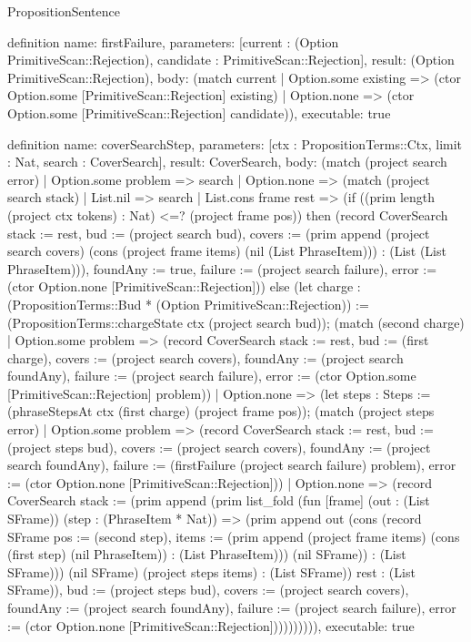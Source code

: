 \begin{lexlean}{PropositionSentence}
\begin{semanticmodule}
definition{
  name: firstFailure,
  parameters: [current : (Option PrimitiveScan::Rejection), candidate : PrimitiveScan::Rejection],
  result: (Option PrimitiveScan::Rejection),
  body: (match current
    | Option.some existing => (ctor Option.some [PrimitiveScan::Rejection] existing)
    | Option.none => (ctor Option.some [PrimitiveScan::Rejection] candidate)),
  executable: true
}

definition{
  name: coverSearchStep,
  parameters: [ctx : PropositionTerms::Ctx, limit : Nat, search : CoverSearch],
  result: CoverSearch,
  body: (match (project search error)
    | Option.some problem => search
    | Option.none => (match (project search stack)
      | List.nil => search
      | List.cons frame rest => (if ((prim length (project ctx tokens) : Nat) <=? (project frame pos)) then (record CoverSearch {stack := rest, bud := (project search bud), covers := (prim append (project search covers) (cons (project frame items) (nil (List PhraseItem))) : (List (List PhraseItem))), foundAny := true, failure := (project search failure), error := (ctor Option.none [PrimitiveScan::Rejection])}) else (let charge : (PropositionTerms::Bud * (Option PrimitiveScan::Rejection)) := (PropositionTerms::chargeState ctx (project search bud)); (match (second charge)
        | Option.some problem => (record CoverSearch {stack := rest, bud := (first charge), covers := (project search covers), foundAny := (project search foundAny), failure := (project search failure), error := (ctor Option.some [PrimitiveScan::Rejection] problem)})
        | Option.none => (let steps : Steps := (phraseStepsAt ctx (first charge) (project frame pos)); (match (project steps error)
          | Option.some problem => (record CoverSearch {stack := rest, bud := (project steps bud), covers := (project search covers), foundAny := (project search foundAny), failure := (firstFailure (project search failure) problem), error := (ctor Option.none [PrimitiveScan::Rejection])})
          | Option.none => (record CoverSearch {stack := (prim append (prim list_fold (fun [frame] (out : (List SFrame)) (step : (PhraseItem * Nat)) => (prim append out (cons (record SFrame {pos := (second step), items := (prim append (project frame items) (cons (first step) (nil PhraseItem)) : (List PhraseItem))}) (nil SFrame)) : (List SFrame))) (nil SFrame) (project steps items) : (List SFrame)) rest : (List SFrame)), bud := (project steps bud), covers := (project search covers), foundAny := (project search foundAny), failure := (project search failure), error := (ctor Option.none [PrimitiveScan::Rejection])})))))))),
  executable: true
}


\end{semanticmodule}
\end{lexlean}
